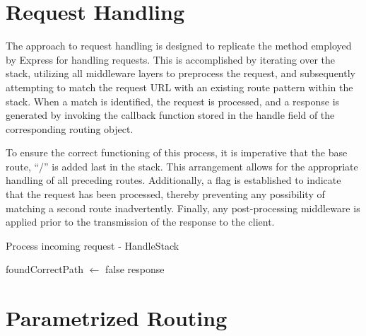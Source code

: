 \section{Request Handling}
\label{sec:req-handling}
The approach to request handling is designed to replicate the method employed by Express for handling requests. This is accomplished by iterating over the stack, utilizing all middleware layers to preprocess the request, and subsequently attempting to match the request URL with an existing route pattern within the stack. When a match is identified, the request is processed, and a response is generated by invoking the callback function stored in the handle field of the corresponding routing object.

To ensure the correct functioning of this process, it is imperative that the base route, “/” is added last in the stack. This arrangement allows for the appropriate handling of all preceding routes. Additionally, a flag is established to indicate that the request has been processed, thereby preventing any possibility of matching a second route inadvertently. Finally, any post-processing middleware is applied prior to the transmission of the response to the client.

\begin{algorithm}[H]
\caption{Process incoming request - HandleStack}
foundCorrectPath $\gets$ false\;
\Return response\;
\end{algorithm}


\section{Parametrized Routing}
\label{sec:param-route}

